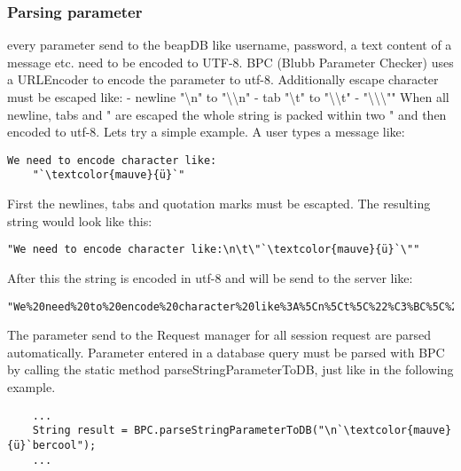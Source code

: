 \documentclass[12pt,a4paper,oneside]{report}
\begin{document}
 \subsubsection{Parsing parameter}
every parameter send to the beapDB like username, password, a text content of a message etc. need to be encoded to UTF-8.
BPC (Blubb Parameter Checker) uses a URLEncoder to encode the parameter to utf-8. 
Additionally escape character must be escaped like:
	- newline "\textbackslash n" to "\textbackslash \textbackslash n"
	- tab "\textbackslash t" to "\textbackslash \textbackslash t"
	- "\textbackslash \textbackslash \textbackslash ""
When all newline, tabs and " are escaped the whole string is packed within two " and then encoded to utf-8.
Lets try a simple example. A user types a message like:
\begin{lstlisting}
We need to encode character like:
	"`\textcolor{mauve}{ü}`"
\end{lstlisting}
First the newlines, tabs and quotation marks must be escapted. The resulting string would look like this:
\begin{lstlisting}
"We need to encode character like:\n\t\"`\textcolor{mauve}{ü}`\""
\end{lstlisting}
After this the string is encoded in utf-8 and will be send to the server like:
\begin{lstlisting}
"We%20need%20to%20encode%20character%20like%3A%5Cn%5Ct%5C%22%C3%BC%5C%22"
\end{lstlisting}
The parameter send to the Request manager for all session request are parsed automatically. Parameter entered in a database query must be parsed with BPC by calling the static method parseStringParameterToDB, just like in the following example.
\begin{lstlisting}
	...
	String result = BPC.parseStringParameterToDB("\n`\textcolor{mauve}{ü}`bercool");
	...
\end{lstlisting}
\end{document}

